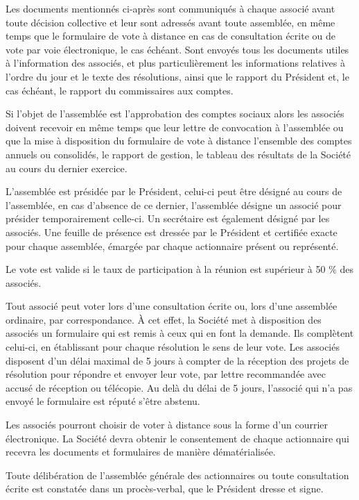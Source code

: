 \documentclass[a4paper,12pt]{report}
\begin{document}
Les documents mentionnés ci-après sont communiqués à chaque associé avant toute décision collective et leur sont adressés avant toute assemblée, en même temps que le formulaire de vote à distance en cas de consultation écrite ou de vote par voie électronique, le cas échéant. Sont envoyés tous les documents utiles à l'information des associés, et plus particulièrement les informations relatives à l'ordre du jour et le texte des résolutions, ainsi que le rapport du Président et, le cas échéant, le rapport du commissaires aux comptes.

Si l'objet de l'assemblée est l'approbation des comptes sociaux alors les associés doivent recevoir en même temps que leur lettre de convocation à l'assemblée ou que la mise à disposition du formulaire de vote à distance l'ensemble des comptes annuels ou consolidés, le rapport de gestion, le tableau des résultats de la Société au cours du dernier exercice.

L'assemblée est présidée par le Président, celui-ci peut être désigné au cours de l'assemblée, en cas d'absence de ce dernier, l'assemblée désigne un associé pour présider temporairement celle-ci. Un secrétaire est également désigné par les associés. Une feuille de présence est dressée par le Président et certifiée exacte pour chaque assemblée, émargée par chaque actionnaire présent ou représenté.

Le vote est valide si le taux de participation à la réunion est supérieur à 50 \% des associés.

Tout associé peut voter lors d'une consultation écrite ou, lors d'une assemblée ordinaire, par correspondance. À cet effet, la Société met à disposition des associés un formulaire qui est remis à ceux qui en font la demande. Ils complètent celui-ci, en établissant pour chaque résolution le sens de leur vote. Les associés disposent d'un délai maximal de 5 jours à compter de la réception des projets de résolution pour répondre et envoyer leur vote, par lettre recommandée avec accusé de réception ou télécopie. Au delà du délai de 5 jours, l'associé qui n'a pas envoyé le formulaire est réputé s'être abstenu.

Les associés pourront choisir de voter à distance sous la forme d'un courrier électronique. La Société devra obtenir le consentement de chaque actionnaire qui recevra les documents et formulaires de manière dématérialisée.

Toute délibération de l'assemblée générale des actionnaires ou toute consultation écrite est constatée dans un procès-verbal, que le Président dresse et signe.
\end{document}
